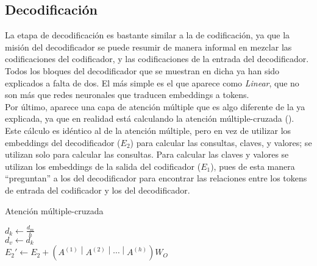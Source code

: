 			\subsection{Decodificación}
			
				La etapa de decodificación es bastante similar a la de codificación, ya que la misión del decodificador se puede resumir de manera informal en mezclar las codificaciones del codificador, y las codificaciones de la entrada del decodificador. Todos los bloques del decodificador que se muestran en dicha  ya han sido explicados a falta de dos. El más simple es el que aparece como \textit{Linear}, que no son más que redes neuronales que traducen embeddings a tokens. \\
				
				Por último, aparece una capa de atención múltiple que es algo diferente de la ya explicada, ya que en realidad está calculando la atención múltiple-cruzada (). Este cálculo es idéntico al de la atención múltiple, pero en vez de utilizar los embeddings del decodificador ($E_2$) para calcular las consultas, claves, y valores; se utilizan solo para calcular las consultas. Para calcular las claves y valores se utilizan los embeddings de la salida del codificador ($E_1$), pues de esta manera ``preguntan'' a los del decodificador para encontrar las relaciones entre los tokens de entrada del codificador y los del decodificador. 
				
				\begin{algorithm}
					\DontPrintSemicolon
					
					\caption{Atención múltiple-cruzada}
					\label{algo:attention_multiple-cruzada}
					
					$d_k \gets \frac{d_m}{h}$\\
					$d_v \gets d_k$\\
					$E_2' \gets E_2 + \left(A^{(1)}\middle|A^{(2)}\middle|\cdots\middle|A^{(h)}\right)W_O$
				\end{algorithm}
				

